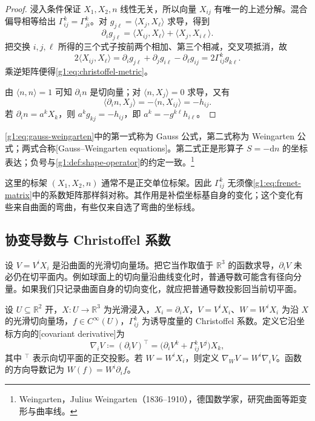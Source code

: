 \begin{proof}
	浸入条件保证 \(X_1,X_2,n\) 线性无关，所以向量 \(X_{ij}\) 有唯一的上述分解。混合偏导相等给出 \(\Gamma^k_{ij}=\Gamma^k_{ji}\)。对 \(g_{j\ell}=\langle X_j,X_\ell\rangle\) 求导，得到
	\[
		\partial_i g_{j\ell}=\langle X_{ij},X_\ell\rangle+\langle X_j,X_{i\ell}\rangle.
	\]
	把交换 \(i,j,\ell\) 所得的三个式子按前两个相加、第三个相减，交叉项抵消，故
	\[
		2\langle X_{ij},X_\ell\rangle
		=\partial_i g_{j\ell}+\partial_j g_{i\ell}-\partial_\ell g_{ij}
		=2\Gamma^k_{ij}g_{k\ell}.
	\]
	乘逆矩阵便得\eqref{g1:eq:christoffel-metric}。

	由 \(\langle n,n\rangle=1\) 可知 \(\partial_i n\) 是切向量；对 \(\langle n,X_j\rangle=0\) 求导，又有
	\[
		\langle\partial_i n,X_j\rangle=-\langle n,X_{ij}\rangle=-h_{ij}.
	\]
	若 \(\partial_i n=a^kX_k\)，则 \(a^kg_{kj}=-h_{ij}\)，即 \(a^k=-g^{k\ell}h_{i\ell}\)。
\end{proof}

\eqref{g1:eq:gauss-weingarten}中的第一式称为 Gauss 公式，第二式称为 Weingarten 公式；两式合称[Gauss--Weingarten equations]。第二式正是形算子 \(S=-\mathrm{d}n\) 的坐标表达；负号与\cref{g1:def:shape-operator}的约定一致。\footnote{Weingarten，Julius Weingarten（1836--1910），德国数学家，研究曲面等距变形与曲率线。}

\ProseParagraphBreak

这里的标架 \((X_1,X_2,n)\) 通常不是正交单位标架。因此 \(\Gamma^k_{ij}\) 无须像\eqref{g1:eq:frenet-matrix}中的系数矩阵那样斜对称。其作用是补偿坐标基自身的变化；这个变化有些来自曲面的弯曲，有些仅来自选了弯曲的坐标线。

\subsection{协变导数与 Christoffel 系数}
\label{g1:subsec:0803:02}

设 \(V=V^iX_i\) 是沿曲面的光滑切向量场。把它当作取值于 \(\mathbb R^3\) 的函数求导，\(\partial_iV\) 未必仍在切平面内。例如球面上的切向量沿曲线变化时，普通导数可能含有径向分量。如果我们只记录曲面自身的切向变化，就应把普通导数投影回当前切平面。

\begin{definition}
	\label{g1:def:surface-covariant-derivative}
	设 \(U\subseteq\mathbb R^2\) 开，\(X:U\rightarrow\mathbb R^3\) 为光滑浸入，\(X_i=\partial_iX\)，\(V=V^iX_i\)、\(W=W^iX_i\) 为沿 \(X\) 的光滑切向量场，\(f\in C^\infty(U)\)，\(\Gamma^k_{ij}\) 为诱导度量的 Christoffel 系数。定义它沿坐标方向的[covariant derivative]为
	\[
		\nabla_iV\coloneqq(\partial_iV)^\top
		=\bigl(\partial_iV^k+\Gamma^k_{ij}V^j\bigr)X_k,
	\]
	其中 \({}^\top\) 表示向切平面的正交投影。若 \(W=W^iX_i\)，则定义 \(\nabla_WV=W^i\nabla_iV\)。函数的方向导数记为 \(W(f)=W^i\partial_i f\)。
\end{definition}

